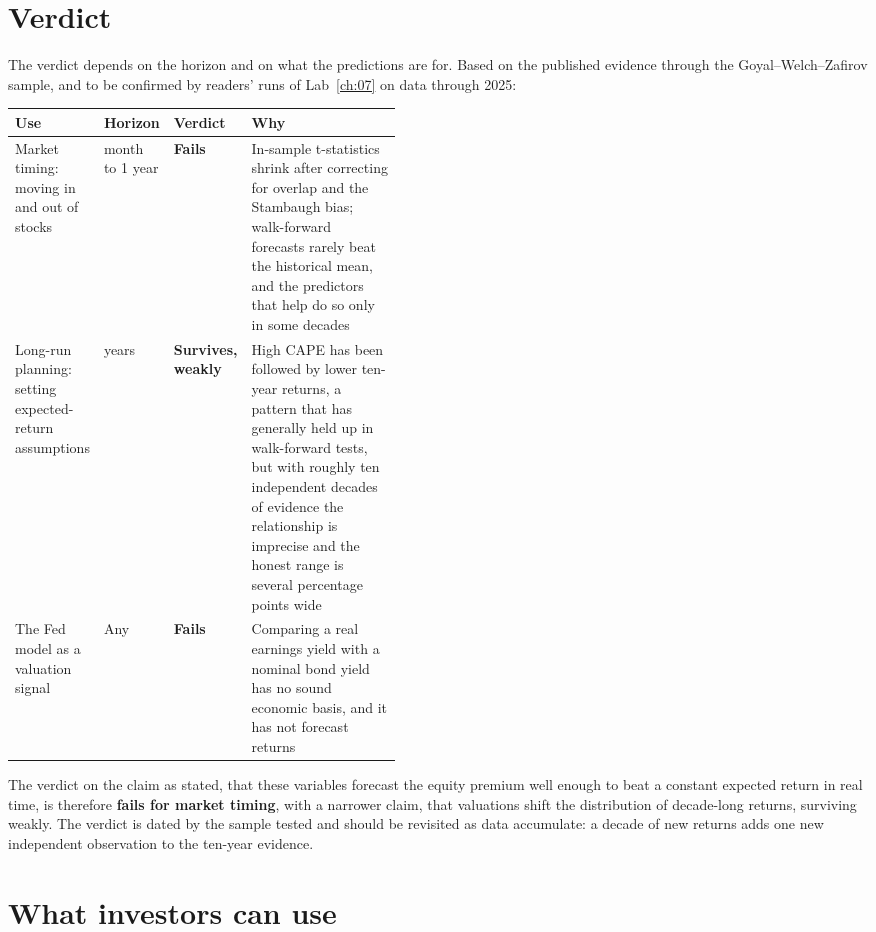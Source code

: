 \section{Verdict}
\label{sec:07-verdict}

The verdict depends on the horizon and on what the predictions are for. Based on the published evidence through the Goyal--Welch--Zafirov sample, and to be confirmed by readers' runs of Lab~\ref{ch:07} on data through 2025:

\begin{center}
\small
\begin{tabularx}{0.9\linewidth}{@{}>{\raggedright\arraybackslash}p{0.21\linewidth}>{\raggedright\arraybackslash}p{0.11\linewidth}>{\raggedright\arraybackslash}p{0.13\linewidth}>{\raggedright\arraybackslash}X@{}}
\toprule
Use & Horizon & Verdict & Why \\
\midrule
Market timing: moving in and out of stocks & 1 month to 1 year & \textbf{Fails} & In-sample t-statistics shrink after correcting for overlap and the Stambaugh bias; walk-forward forecasts rarely beat the historical mean, and the predictors that help do so only in some decades \\
Long-run planning: setting expected-return assumptions & 10 years & \textbf{Survives, weakly} & High CAPE has been followed by lower ten-year returns, a pattern that has generally held up in walk-forward tests, but with roughly ten independent decades of evidence the relationship is imprecise and the honest range is several percentage points wide \\
The Fed model as a valuation signal & Any & \textbf{Fails} & Comparing a real earnings yield with a nominal bond yield has no sound economic basis, and it has not forecast returns \\
\bottomrule
\end{tabularx}
\end{center}

The verdict on the claim as stated, that these variables forecast the equity premium well enough to beat a constant expected return in real time, is therefore \textbf{fails for market timing}, with a narrower claim, that valuations shift the distribution of decade-long returns, surviving weakly. The verdict is dated by the sample tested and should be revisited as data accumulate: a decade of new returns adds one new independent observation to the ten-year evidence.

\section{What investors can use}
\label{sec:07-investors}

